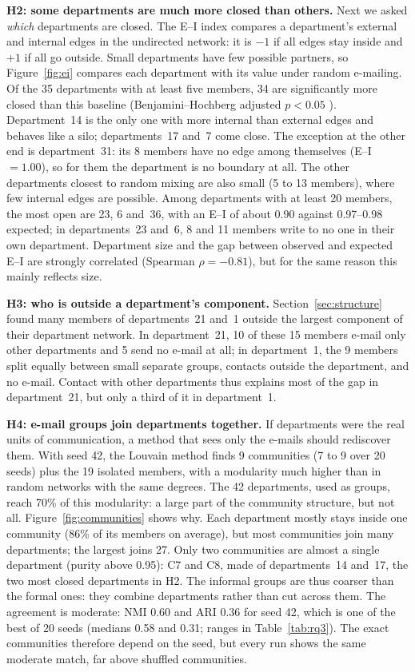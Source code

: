\textbf{H2: some departments are much more closed than others.} Next we asked
\emph{which} departments are closed. The E--I index \cite{krackhardtstern1988} compares a department's
external and internal edges in the undirected network: it is $-1$ if all edges stay inside and $+1$ if
all go outside. Small departments have few possible partners, so
Figure~\ref{fig:ei} compares each department with its value under random
e-mailing. Of the 35 departments with at least five members, 34 are
significantly more closed than this baseline (Benjamini--Hochberg adjusted
$p<0.05$ \cite{benjamini1995}).
Department~14 is the only one with more internal than external edges and
behaves like a silo; departments~17 and~7 come close. The exception at the
other end is department~31: its 8 members have no edge among themselves
(E--I $=1.00$), so for them the department is no boundary at all. The other
departments closest to random mixing are also small (5 to 13 members), where
few internal edges are possible. Among departments with at least 20 members,
the most open are 23, 6 and~36, with an E--I of about 0.90 against 0.97--0.98
expected; in departments~23 and~6, 8 and 11 members write to no one in their
own department. Department size and the gap between observed and expected
E--I are strongly correlated (Spearman $\rho=-0.81$), but for the same reason
this mainly reflects size.

\textbf{H3: who is outside a department's component.} Section~\ref{sec:structure}
found many members of departments~21 and~1 outside the largest component of
their department network. In department~21, 10 of these 15 members e-mail only
other departments and 5 send no e-mail at all; in department~1, the 9 members
split equally between small separate groups, contacts outside the department,
and no e-mail. Contact with other departments thus explains most of the gap in
department~21, but only a third of it in department~1.

\textbf{H4: e-mail groups join departments together.} If departments were the
real units of communication, a method that sees only the e-mails should
rediscover them. With seed 42, the Louvain method \cite{blondel2008} finds 9 communities
(7 to 9 over 20 seeds) plus the 19 isolated members, with a modularity much higher than in random networks
with the same degrees. The 42 departments, used as groups, reach 70\% of this
modularity: a large part of the community structure, but not all. Figure~\ref{fig:communities} shows why. Each department mostly stays
inside one community (86\% of its members on average), but most communities
join many departments; the largest joins 27. Only two communities are almost a
single department (purity above 0.95): C7 and C8, made of departments~14
and~17, the two most closed departments in H2. The informal
groups are thus coarser than the formal ones: they combine departments rather
than cut across them. The agreement is moderate: NMI 0.60 and ARI 0.36
\cite{danon2005,hubert1985} for seed 42, which is one of the best of 20 seeds
(medians 0.58 and 0.31; ranges in Table~\ref{tab:rq3}). The exact communities
therefore depend on the seed, but every run shows the same moderate match, far
above shuffled communities.

